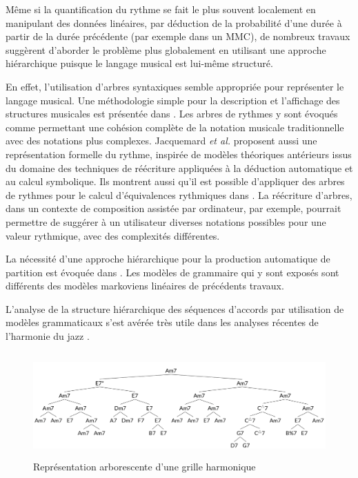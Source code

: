 Même si la quantification du rythme se fait le plus souvent localement en
manipulant des données linéaires, par déduction de la probabilité d’une durée à
partir de la durée précédente (par exemple dans un MMC), de nombreux travaux
suggèrent d’aborder le problème plus globalement en utilisant une approche
hiérarchique puisque le langage musical est lui-même structuré.

En effet, l’utilisation d’arbres syntaxiques semble appropriée pour représenter
le langage musical. Une méthodologie simple pour la description et l’affichage
des structures musicales est présentée dans \cite{rythm_tree}. Les arbres de
rythmes y sont évoqués comme permettant une cohésion complète de la notation
musicale traditionnelle avec des notations plus complexes. Jacquemard
\textit{et al.} \cite{jacquemard_1} proposent aussi une représentation
formelle du rythme, inspirée de modèles théoriques antérieurs issus du domaine
des techniques de réécriture appliquées à la déduction automatique et au calcul
symbolique. Ils montrent aussi qu’il est possible d’appliquer des arbres de
rythmes pour le calcul d’équivalences rythmiques dans
\cite{jacquemard_2}. La réécriture d’arbres, dans un contexte de
composition assistée par ordinateur, par exemple, pourrait permettre de
suggérer à un utilisateur diverses notations possibles pour une valeur
rythmique, avec des complexités différentes.

La nécessité d’une approche hiérarchique pour la production automatique de
partition est évoquée dans \cite{foscarin}. 
Les modèles de grammaire qui y sont exposés sont différents des modèles
markoviens linéaires de précédents travaux.

L’analyse de la structure hiérarchique des séquences d’accords par utilisation
de modèles grammaticaux s’est avérée très utile dans les analyses récentes de
l’harmonie du jazz \cite{harasimjazz}. 


\begin{figure}[h]
	\centering
	\includegraphics[height=40mm, width=120mm]{
    z_images/2_etat_de_l_art/1_summertime_tree.png}
    \caption{Représentation arborescente d’une grille harmonique
    \protect\cite{harasimjazz}}
    \label{arbre_harmo}
\end{figure}

